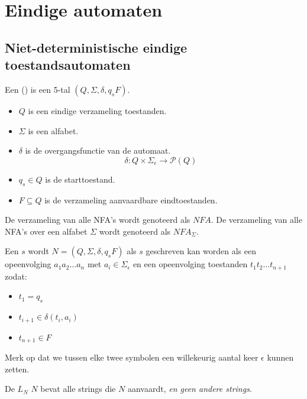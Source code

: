 \documentclass[main.tex]{subfiles}
\begin{document}
\chapter{Eindige automaten}
\label{cha:eindige-automaten}

\section{Niet-deterministische eindige toestandsautomaten}
\label{sec:niet-deterministische-eindige-automaten}

\begin{de}
  Een  () is een 5-tal $(Q,\Sigma,\delta,q_{s}F)$.
  \begin{itemize}
  \item $Q$ is een eindige verzameling toestanden.
  \item $\Sigma$ is een alfabet.
  \item $\delta$ is de overgangsfunctie van de automaat.
  \[ \delta: Q \times \Sigma_{\epsilon} \rightarrow \mathcal{P}(Q) \]
  \item $q_{s} \in Q$ is de starttoestand.
  \item $F \subseteq Q$ is de verzameling aanvaardbare eindtoestanden.
  \end{itemize}
\end{de}

\begin{de}
  De verzameling van alle NFA's wordt genoteerd als $NFA$.
  De verzameling van alle NFA's over een alfabet $\Sigma$ wordt genoteerd als $NFA_{\Sigma}$.
\end{de}

\begin{de}
  Een  $s$ wordt  $N=(Q,\Sigma,\delta,q_{s}F)$ als $s$ geschreven kan worden als een opeenvolging $a_{1}a_{2}\ldots a_{n}$ met $a_{i} \in \Sigma_{\epsilon}$ en een opeenvolging toestanden $t_{1}t_{2}\ldots t_{n+1}$ zodat:
  \begin{itemize}
  \item $t_{1} = q_{s}$
  \item $t_{i+1} \in \delta(t_{i},a_{i})$
  \item $t_{n+1} \in F$
  \end{itemize}
  Merk op dat we tussen elke twee symbolen een willekeurig aantal keer $\epsilon$ kunnen zetten.
\end{de}

\begin{de}
  De  $L_{N}$  $N$ bevat alle strings die $N$ aanvaardt, \textit{en geen andere strings}.
\end{de}
\end{document}
